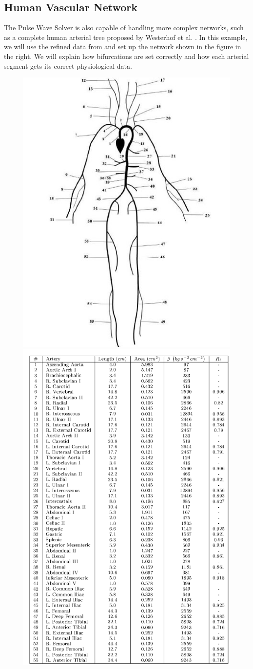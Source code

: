 \subsection{Human Vascular Network}
The Pulse Wave Solver is also capable of handling more complex networks, such as
a complete human arterial tree proposed by Westerhof et al. \cite{We69}.
In this example, we will use the refined data from \cite{ShFoPeFr03} and set up
the network shown in the figure in the right. We will explain how bifurcations
are set correctly and how each arterial segment gets its correct physiological
data.

\begin{figure}
	\includegraphics[width=0.49\linewidth]{Figures/55_artery_network.jpg}
	\includegraphics[width=0.49\linewidth]{Figures/Data_Table.png}
\end{figure}

